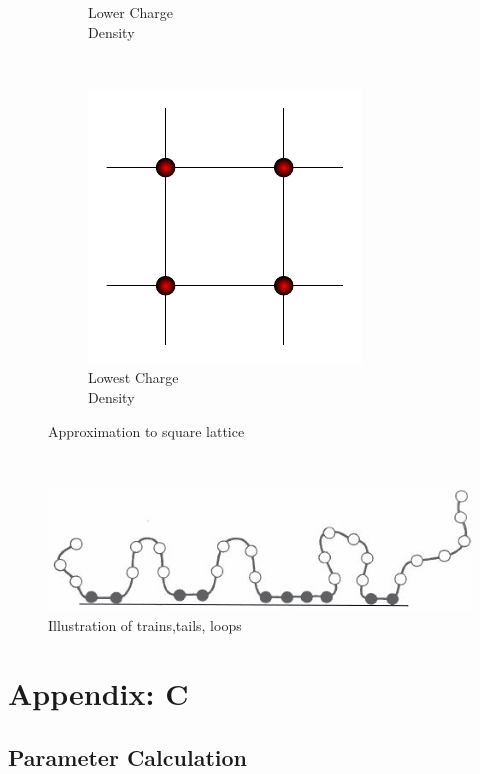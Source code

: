 \documentclass[10pt,letterpaper]{article}
\begin{document}
\begin{figure}[h!]
\begin{subfigure}[b]{0.30\textwidth}
		\caption{Lower Charge \\Density}
		\label{fig:gull}	
	\end{subfigure}~~~~~~~~~~~
	\begin{subfigure}[b]{0.30\textwidth}
		\centering
		\includegraphics[scale=0.98]{squarelatticeSparse.pdf}
		\caption{Lowest Charge \\Density}
		\label{fig:gull}
	\end{subfigure}
	\caption{Approximation to square lattice}
\end{figure}

\textbf{}\\
\begin{figure}[h!]
	\centering
	\includegraphics[scale=0.5]{Clipboard.png}
	\caption{Illustration of trains,tails, loops\cite{fleer1993polymers}}
	\label{fig:gull}
\end{figure}


\newpage
\section{Appendix: C}
\subsection{Parameter Calculation}
\end{document}
